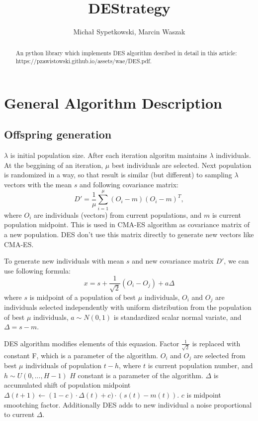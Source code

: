 \documentclass[11pt,a4paper]{article}
\title{DEStrategy}
\author{Michał Sypetkowski, Marcin Waszak}
\date{}
\begin{document}
\maketitle

\begin{abstract}
An python library which implements DES algorithm desribed in detail in this article: https://pzawistowski.github.io/assets/wae/DES.pdf.
\end{abstract}

\section{General Algorithm Description}\label{sec:general}

\subsection{Offspring generation}\label{subsec:offspring}

$\lambda$ is initial population size.
After each iteration algoritm maintains $\lambda$ individuals.
At the beggining of an iteration, $\mu$ best individuals are selected.
Next population is randomized in a way, so that result is similar (but different) to sampling $\lambda$ vectors with the mean $s$ and following covariance matrix:
\begin{equation}
    D' = \frac{1}{\mu} \sum_{i=1}^{\mu} (O_i - m)(O_i - m)^T,
    \label{eqn:equa1}
\end{equation}
where $O_i$ are individuals (vectors) from current populations, and $m$ is current population midpoint.
This is used in CMA-ES algorithm as covariance matrix of a new population.
DES don't use this matrix directly to generate new vectors like CMA-ES.

To generate new individuals with mean $s$ and new covariance matrix $D'$, we can use following formula:
\begin{equation}
    x = s + \frac{1}{\sqrt2}(O_i - O_j) + a\Delta
\end{equation}
where $s$ is midpoint of a population of best $\mu$ individuals,
$O_i$ and $O_j$ are individuals selected independently with uniform distribution from the population of best $\mu$ individuals,
$a \sim N(0,1)$ is standardized scalar normal variate,
and $\Delta=s-m$.

DES algorithm modifies elements of this equasion.
Factor $\frac{1}{\sqrt2}$ is replaced with constant F, which is a parameter of the algorithm.
$O_i$ and $O_j$ are selected from best $\mu$ individuals of population $t-h$, where $t$ is current population number, and $h \sim U(0, ..., H-1)$
$H$ constant is a parameter of the algorithm.
$\Delta$ is accumulated shift of population midpoint
$\Delta(t+1) \leftarrow (1-c)\cdot\Delta(t)+c)\cdot(s(t)-m(t))$.
$c$ is midpoint smootching factor.
Additionally DES adds to new individual a noise proportional to current $\Delta$.
\end{document}
